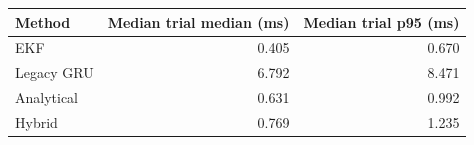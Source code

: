 \begin{tabular}{lrr}
\toprule
Method & Median trial median (ms) & Median trial p95 (ms) \\
\midrule
EKF & 0.405 & 0.670 \\
Legacy GRU & 6.792 & 8.471 \\
Analytical & 0.631 & 0.992 \\
Hybrid & 0.769 & 1.235 \\
\bottomrule
\end{tabular}
